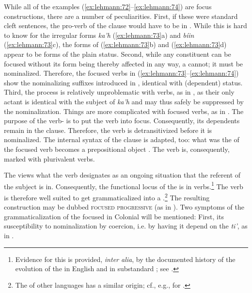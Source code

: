 \documentclass[output=paper]{langsci/langscibook}
\begin{document}
While all of the examples (\ref{ex:lehmann:72}–\ref{ex:lehmann:74}) are focus constructions, there are a number of peculiarities. First, if these were standard cleft sentences, the pro-verb of the  clause would have to be in . While this is hard to know for the irregular forms \textit{ka’h} (\ref{ex:lehmann:73}a) and \textit{bíin} (\ref{ex:lehmann:73}c), the forms of (\ref{ex:lehmann:73}b) and (\ref{ex:lehmann:73}d) appear to be forms of the plain status. Second, while any constituent can be focused without its form being thereby affected in any way, a  cannot; it must be nominalized. Therefore, the focused verbs in (\ref{ex:lehmann:73}–\ref{ex:lehmann:74}) show the nominalizing suffixes introduced in , identical with  (dependent) status. Third, the process is relatively unproblematic with  verbs, as in , as their only actant is identical with the subject of \textit{ka’h} and may thus safely be suppressed by the nominalization. Things are more complicated with  focused verbs, as in . The purpose of the verb- is to put the verb into focus. Consequently, its dependents remain in the  clause. Therefore, the verb is detransitivized before it is nominalized. The internal syntax of the  clause is adapted, too: what was the  of the focused verb becomes a prepositional object \citep[§172]{Beltrán1746}. The verb  is, consequently, marked with plurivalent verbs.

{ The  views what the verb designates as an ongoing situation that the referent of the subject is in. Consequently, the functional locus of the  is in  verbs.\footnote{Evidence for this is provided, \textit{inter alia}, by the documented history of the evolution of the  in English and in substandard ; see \citealt[section 3.2]{Lehmann1991}.}   The verb  is therefore well suited to get grammaticalized into a} .\footnote{The  of other languages has a similar origin; cf., e.g., \citet{Güldemann2003} for .} The resulting construction may be dubbed \textsc{focused progressive} (as in \citealt{Lehmann2008}). Two symptoms of the grammaticalization of the focused  in Colonial   will be mentioned: First, its susceptibility to nominalization by coercion, i.e. by having it depend on the  \textit{ti’}, as in .
\end{document}
